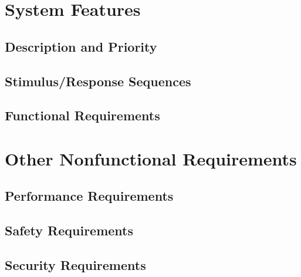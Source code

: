 \documentclass{scrreprt}
\begin{document}
\begin{CJK*}{UTF8}{bsmi}
\chapter{System Features}

\section{Description and Priority}


\section{Stimulus/Response Sequences}


\section{Functional Requirements}




\chapter{Other Nonfunctional Requirements}

\section{Performance Requirements}


\section{Safety Requirements} 

\section{Security Requirements}


\end{CJK*}
\end{document}
